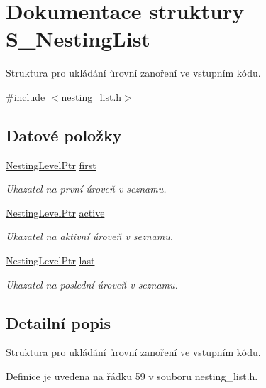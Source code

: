 \hypertarget{struct_s___nesting_list}{}\section{Dokumentace struktury S\+\_\+\+Nesting\+List}
\label{struct_s___nesting_list}


Struktura pro ukládání ůrovní zanoření ve vstupním kódu.  




{\ttfamily \#include $<$nesting\+\_\+list.\+h$>$}

\subsection*{Datové položky}
\begin{DoxyCompactItemize}
\item 
\hyperlink{nesting__list_8h_aea99292989d40bb6f97ba07eb2c820a6}{Nesting\+Level\+Ptr} \hyperlink{struct_s___nesting_list_a0dd509a2bd6569870b1c8ad52756e1d2}{first}
\begin{DoxyCompactList}\small\item\em Ukazatel na první úroveň v seznamu. \end{DoxyCompactList}\item 
\hyperlink{nesting__list_8h_aea99292989d40bb6f97ba07eb2c820a6}{Nesting\+Level\+Ptr} \hyperlink{struct_s___nesting_list_a4439f6bf153d709b43d692ca94351864}{active}
\begin{DoxyCompactList}\small\item\em Ukazatel na aktivní úroveň v seznamu. \end{DoxyCompactList}\item 
\hyperlink{nesting__list_8h_aea99292989d40bb6f97ba07eb2c820a6}{Nesting\+Level\+Ptr} \hyperlink{struct_s___nesting_list_a7de84b12b0b72abcbbc82432d18474cf}{last}
\begin{DoxyCompactList}\small\item\em Ukazatel na poslední úroveň v seznamu. \end{DoxyCompactList}\end{DoxyCompactItemize}


\subsection{Detailní popis}
Struktura pro ukládání ůrovní zanoření ve vstupním kódu. 

Definice je uvedena na řádku 59 v souboru nesting\+\_\+list.\+h.



